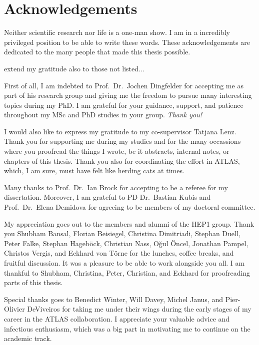 \chapter*{Acknowledgements}

Neither scientific research nor life is a one-man show.
%
I am in a incredibly privileged position to be able to write these words. These
acknowledgements are dedicated to the many people that made this thesis
possible.

extend my gratitude also to those not listed...

First of all, I am indebted to Prof.\ Dr.\ Jochen Dingfelder for accepting me as
part of his research group and giving me the freedom to pursue many interesting
topics during my PhD. I am grateful for your guidance, support, and patience
throughout my MSc and PhD studies in your group. \emph{Thank you!}

I would also like to express my gratitude to my co-supervisor Tatjana
Lenz. Thank you for supporting me during my studies and for the many occassions
where you proofread the things I wrote, be it abstracts, internal notes, or
chapters of this thesis. Thank you also for coordinating the \bbtautau effort in
ATLAS, which, I am sure, must have felt like herding cats at times.

Many thanks to Prof.\ Dr.\ Ian Brock for accepting to be a referee for my
dissertation. Moreover, I am grateful to PD Dr.\ Bastian Kubis and Prof.\ Dr.\
Elena Demidova for agreeing to be members of my doctoral committee.

My appreciation goes out to the members and alumni of the \textsc{HEP1}
group. Thank you Shubham Bansal, Florian Beisiegel, Christina Dimitriadi,
Stephan Duell, Peter Falke, Stephan Hageböck, Christian Nass, Oğul Öncel,
Jonathan Pampel, Christos Vergis, and Eckhard von Törne for the lunches, coffee
breaks, and fruitful discussion. It was a pleasure to be able to work alongside
you all. I am thankful to Shubham, Christina, Peter, Christian, and Eckhard for
proofreading parts of this thesis.

Special thanks goes to Benedict Winter, Will Davey, Michel Janus, and
Pier-Olivier DeViveiros for taking me under their wings during the early stages
of my career in the ATLAS collaboration. I appreciate your valuable advice and
infectious enthusiasm, which was a big part in motivating me to continue on the
academic track.

